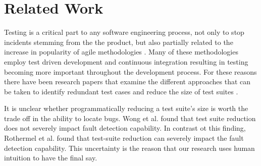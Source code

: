\chapter{Related Work}\label{C:related}


Testing is a critical part to any software engineering process, not only to stop incidents stemming from the the product, but also partially related to the increase in popularity of agile methodologies \cite{chaos}. Many of these methodologies employ test driven development and continuous integration resulting in testing becoming more important throughout the development process. For these reasons there have been research papers that examine the different approaches that can be taken to identify redundant test cases and reduce the size of test suites \cite{wong1995effect, wong1999test, rothermel1998empirical, rothermel2002empirical,koochakzadeh2009test,zhang2011empirical,li2008static}.

It is unclear whether programmatically reducing a test suite's size is worth the trade off in the ability to locate bugs.  Wong et al. \cite{wong1995effect, wong1999test} found that test suite reduction does not severely impact fault detection capability. In contrast ot this finding, Rothermel et al. \cite{rothermel1998empirical, rothermel2002empirical} found that test-suite reduction can severely impact the fault detection capability. This uncertainty is the reason that our research uses human intuition to have the final say.

